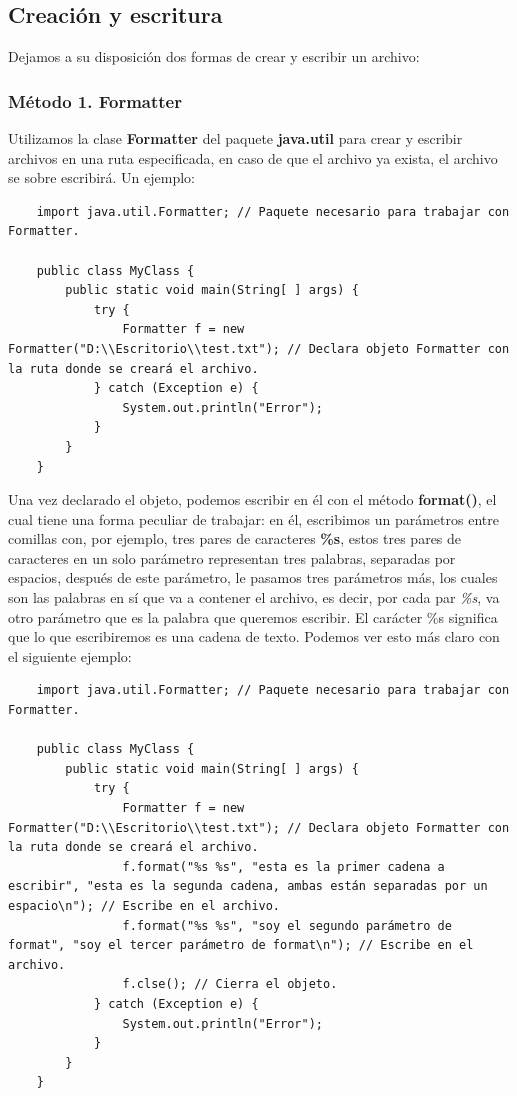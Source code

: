 \subsection{Creación y escritura}
\hspace{0.55cm}Dejamos a su disposición dos formas de crear y escribir un archivo:


\subsubsection{Método 1. Formatter}
\hspace{0.55cm}Utilizamos la clase \textbf{Formatter} del paquete \textbf{java.util} para crear y escribir archivos en una ruta especificada, en caso de que el archivo ya exista, el archivo se sobre escribirá. Un ejemplo:
\begin{lstlisting}
    import java.util.Formatter; // Paquete necesario para trabajar con Formatter.

    public class MyClass {
        public static void main(String[ ] args) {
            try {
                Formatter f = new Formatter("D:\\Escritorio\\test.txt"); // Declara objeto Formatter con la ruta donde se creará el archivo.
            } catch (Exception e) {
                System.out.println("Error");
            }
        }
    }
\end{lstlisting}

Una vez declarado el objeto, podemos escribir en él con el método \textbf{format()}, el cual tiene una forma peculiar de trabajar: en él, escribimos un parámetros entre comillas con, por ejemplo, tres pares de caracteres \textbf{\%s}, estos tres pares de caracteres en un solo parámetro representan tres palabras, separadas por espacios, después de este parámetro, le pasamos tres parámetros más, los cuales son las palabras en sí que va a contener el archivo, es decir, por cada par \textit{\%s}, va otro parámetro que es la palabra que queremos escribir. El carácter \%s significa que lo que escribiremos es una cadena de texto. Podemos ver esto más claro con el siguiente ejemplo:
\begin{lstlisting}
    import java.util.Formatter; // Paquete necesario para trabajar con Formatter.

    public class MyClass {
        public static void main(String[ ] args) {
            try {
                Formatter f = new Formatter("D:\\Escritorio\\test.txt"); // Declara objeto Formatter con la ruta donde se creará el archivo.
                f.format("%s %s", "esta es la primer cadena a escribir", "esta es la segunda cadena, ambas están separadas por un espacio\n"); // Escribe en el archivo.
                f.format("%s %s", "soy el segundo parámetro de format", "soy el tercer parámetro de format\n"); // Escribe en el archivo.
                f.clse(); // Cierra el objeto.
            } catch (Exception e) {
                System.out.println("Error");
            }
        }
    }
\end{lstlisting}


